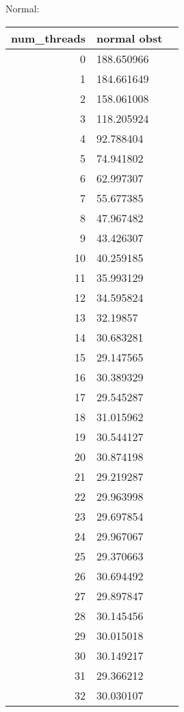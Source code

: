 \documentclass[a4paper,12pt]{scrartcl}
\begin{document}
Normal:\\
\begin{tabular}{|r|l|l|}
num\_threads & normal obst \\  \hline 
0  & 188.650966\\ \hline 
1  & 184.661649\\ \hline 
2  & 158.061008\\ \hline
3  & 118.205924\\ \hline
4  & 92.788404 \\ \hline
5  & 74.941802 \\ \hline
6  & 62.997307 \\ \hline
7  & 55.677385 \\ \hline
8  & 47.967482 \\ \hline
9  & 43.426307 \\ \hline
10 & 40.259185 \\ \hline
11 & 35.993129 \\ \hline
12 & 34.595824 \\ \hline
13 & 32.19857  \\ \hline
14 & 30.683281 \\ \hline
15 & 29.147565 \\ \hline
16 & 30.389329 \\ \hline
17 & 29.545287 \\ \hline
18 & 31.015962 \\ \hline
19 & 30.544127 \\ \hline
20 & 30.874198 \\ \hline
21 & 29.219287 \\ \hline
22 & 29.963998 \\ \hline
23 & 29.697854 \\ \hline
24 & 29.967067 \\ \hline
25 & 29.370663 \\ \hline
26 & 30.694492 \\ \hline
27 & 29.897847 \\ \hline
28 & 30.145456 \\ \hline
29 & 30.015018 \\ \hline
30 & 30.149217 \\ \hline
31 & 29.366212 \\ \hline
32 & 30.030107 \\ \hline
\end{tabular} 
\end{document}

